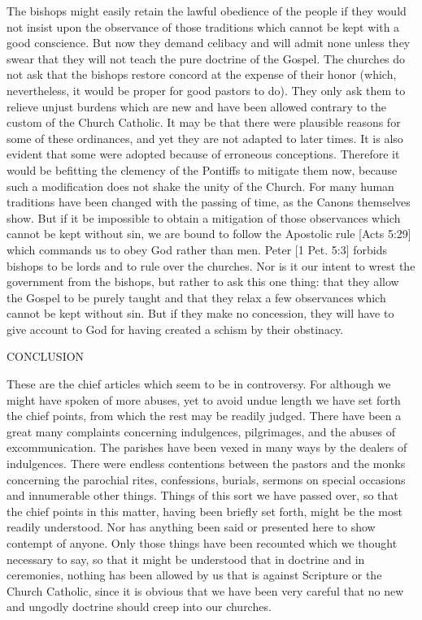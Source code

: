 The bishops might easily retain the lawful obedience of the people if they would not insist upon the observance of those traditions which cannot be kept with a good conscience. But now they demand celibacy and will admit none unless they swear that they will not teach the pure doctrine of the Gospel. The churches do not ask that the bishops restore concord at the expense of their honor (which, nevertheless, it would be proper for good pastors to do). They only ask them to relieve unjust burdens which are new and have been allowed contrary to the custom of the Church Catholic. It may be that there were plausible reasons for some of these ordinances, and yet they are not adapted to later times. It is also evident that some were adopted because of erroneous conceptions. Therefore it would be befitting the clemency of the Pontiffs to mitigate them now, because such a modification does not shake the unity of the Church. For many human traditions have been changed with the passing of time, as the Canons themselves show. But if it be impossible to obtain a mitigation of those observances which cannot be kept without sin, we are bound to follow the Apostolic rule [Acts 5:29] which commands us to obey God rather than men. Peter [1 Pet. 5:3] forbids bishops to be lords and to rule over the churches. Nor is it our intent to wrest the government from the bishops, but rather to ask this one thing: that they allow the Gospel to be purely taught and that they relax a few observances which cannot be kept without sin. But if they make no concession, they will have to give account to God for having created a schism by their obstinacy.

 

CONCLUSION

These are the chief articles which seem to be in controversy. For although we might have spoken of more abuses, yet to avoid undue length we have set forth the chief points, from which the rest may be readily judged. There have been a great many complaints concerning indulgences, pilgrimages, and the abuses of excommunication. The parishes have been vexed in many ways by the dealers of indulgences. There were endless contentions between the pastors and the monks concerning the parochial rites, confessions, burials, sermons on special occasions and innumerable other things. Things of this sort we have passed over, so that the chief points in this matter, having been briefly set forth, might be the most readily understood. Nor has anything been said or presented here to show contempt of anyone. Only those things have been recounted which we thought necessary to say, so that it might be understood that in doctrine and in ceremonies, nothing has been allowed by us that is against Scripture or the Church Catholic, since it is obvious that we have been very careful that no new and ungodly doctrine should creep into our churches.

